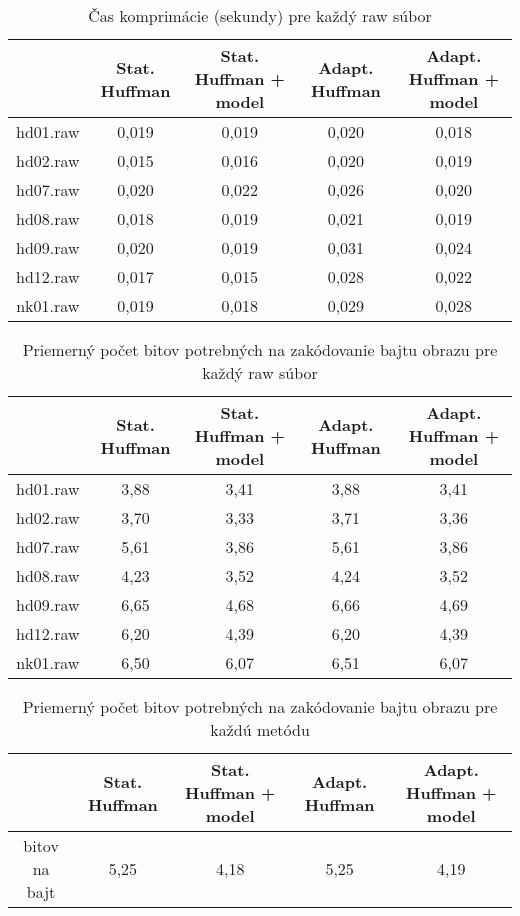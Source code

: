 \documentclass[10pt,a4paper]{article}
\begin{document}
\begin{table}[H]
	\begin{tabular}{|c|c|c|c|c|}
		\hline
		& Stat. Huffman & Stat. Huffman + model & Adapt. Huffman & Adapt. Huffman + model \\
		\hline
		hd01.raw & 0,019 & 0,019 & 0,020 & 0,018 \\
		\hline
		hd02.raw & 0,015 & 0,016 & 0,020 & 0,019 \\
		\hline
		hd07.raw & 0,020 & 0,022 & 0,026 & 0,020 \\
		\hline
		hd08.raw & 0,018 & 0,019 & 0,021 & 0,019 \\
		\hline
		hd09.raw & 0,020 & 0,019 & 0,031 & 0,024 \\
		\hline
		hd12.raw & 0,017 & 0,015 & 0,028 & 0,022 \\
		\hline
		nk01.raw & 0,019 & 0,018 & 0,029 & 0,028 \\
		\hline                               
	\end{tabular}
	\caption{Čas komprimácie (sekundy) pre každý raw súbor}
\end{table}

\begin{table}[H]
	\begin{tabular}{|c|c|c|c|c|}
		\hline
		& Stat. Huffman & Stat. Huffman + model & Adapt. Huffman & Adapt. Huffman + model \\
		\hline
		hd01.raw & 3,88 & 3,41 & 3,88 & 3,41 \\
		\hline
		hd02.raw & 3,70 & 3,33 & 3,71 & 3,36 \\
		\hline
		hd07.raw & 5,61 & 3,86 & 5,61 & 3,86 \\
		\hline
		hd08.raw & 4,23 & 3,52 & 4,24 & 3,52 \\
		\hline
		hd09.raw & 6,65 & 4,68 & 6,66 & 4,69 \\
		\hline
		hd12.raw & 6,20 & 4,39 & 6,20 & 4,39 \\
		\hline
		nk01.raw & 6,50 & 6,07 & 6,51 & 6,07 \\
		\hline                               
	\end{tabular}
	\caption{Priemerný počet bitov potrebných na zakódovanie bajtu obrazu pre každý raw súbor}
\end{table}

\begin{table}[H]
	\begin{tabular}{|c|c|c|c|c|}
		\hline
		& Stat. Huffman & Stat. Huffman + model & Adapt. Huffman & Adapt. Huffman + model \\
		\hline
		bitov na bajt & 5,25 & 4,18 & 5,25 & 4,19 \\
		\hline                            
	\end{tabular}
	\caption{Priemerný počet bitov potrebných na zakódovanie bajtu obrazu pre každú metódu}
\end{table}
\end{document}
